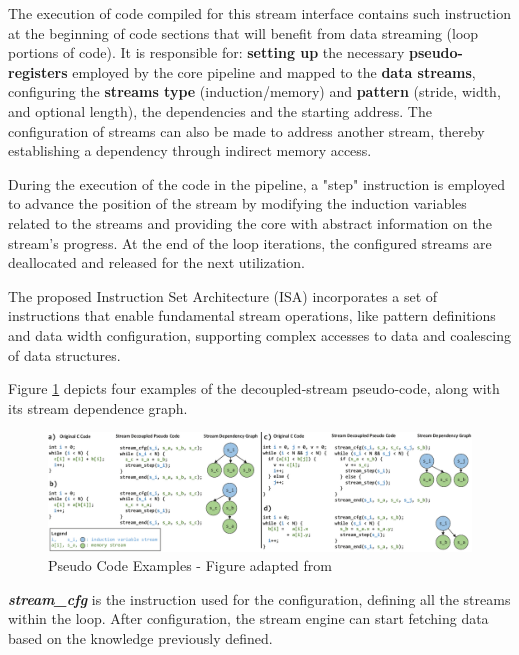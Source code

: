 The execution of code compiled for this stream interface contains such instruction at the beginning of code sections that will benefit from data streaming (loop portions of code). It is responsible for: \textbf{setting up} the necessary \textbf{pseudo-registers} employed by the core pipeline and mapped to the \textbf{data streams}, configuring the \textbf{streams type} (induction/memory) and \textbf{pattern} (stride, width, and optional length),  the dependencies and the starting address. The configuration of streams can also be made to address another stream, thereby establishing a dependency through indirect memory access.

During the execution of the code in the pipeline, a "step" instruction is employed to advance the position of the stream by modifying the induction variables related to the streams and providing the core with abstract information on the stream's progress. At the end of the loop iterations, the configured streams are deallocated and released for the next utilization.

The proposed Instruction Set Architecture (\acrshort{ISA}) incorporates a set of instructions that enable fundamental stream operations, like pattern definitions and data width configuration, supporting complex accesses to data and coalescing of data structures. 

Figure \ref{fig:SD_execution} depicts four examples of the decoupled-stream pseudo-code, along with its stream dependence graph.

\begin{figure}[H]
\begin{center}
\includegraphics[width=0.97\linewidth]{images/SD_execution.pdf}
\caption{Pseudo Code Examples - Figure adapted from \cite{8980305}}
\label{fig:SD_execution}
\end{center}
\end{figure}

\textbf{\textit{stream\_cfg}} is the instruction used for the configuration, defining all the streams within the loop. After configuration, the stream engine can start fetching data based on the knowledge previously defined.

